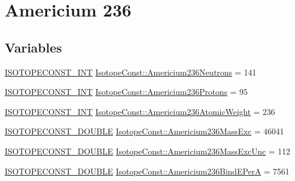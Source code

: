 \hypertarget{group___isotope_const-_americium-_am236}{}\section{Americium 236}
\label{group___isotope_const-_americium-_am236}
\subsection*{Variables}
\begin{DoxyCompactItemize}
\item 
\mbox{\hyperlink{group___isotope_const-_macros_ga5f18360b3e99483a35c32d789e62621c}{I\+S\+O\+T\+O\+P\+E\+C\+O\+N\+S\+T\+\_\+\+I\+NT}} \mbox{\hyperlink{group___isotope_const-_americium-_am236_ga22a544d3981fc8624a3f034f46842110}{Isotope\+Const\+::\+Americium236\+Neutrons}} = 141
\item 
\mbox{\hyperlink{group___isotope_const-_macros_ga5f18360b3e99483a35c32d789e62621c}{I\+S\+O\+T\+O\+P\+E\+C\+O\+N\+S\+T\+\_\+\+I\+NT}} \mbox{\hyperlink{group___isotope_const-_americium-_am236_ga2ce8cc547af7c6305e6d8a7a3defabe1}{Isotope\+Const\+::\+Americium236\+Protons}} = 95
\item 
\mbox{\hyperlink{group___isotope_const-_macros_ga5f18360b3e99483a35c32d789e62621c}{I\+S\+O\+T\+O\+P\+E\+C\+O\+N\+S\+T\+\_\+\+I\+NT}} \mbox{\hyperlink{group___isotope_const-_americium-_am236_ga891b4f99de01095c796bd4e4e93f6797}{Isotope\+Const\+::\+Americium236\+Atomic\+Weight}} = 236
\item 
\mbox{\hyperlink{group___isotope_const-_macros_ga8f45a7272ce02c0b4c65c44636ed719a}{I\+S\+O\+T\+O\+P\+E\+C\+O\+N\+S\+T\+\_\+\+D\+O\+U\+B\+LE}} \mbox{\hyperlink{group___isotope_const-_americium-_am236_ga6058842ebccca24c51eaccd2c54f6528}{Isotope\+Const\+::\+Americium236\+Mass\+Exc}} = 46041
\item 
\mbox{\hyperlink{group___isotope_const-_macros_ga8f45a7272ce02c0b4c65c44636ed719a}{I\+S\+O\+T\+O\+P\+E\+C\+O\+N\+S\+T\+\_\+\+D\+O\+U\+B\+LE}} \mbox{\hyperlink{group___isotope_const-_americium-_am236_gad7f5702ac4aaba8216a31a4003badb5e}{Isotope\+Const\+::\+Americium236\+Mass\+Exc\+Unc}} = 112
\item 
\mbox{\hyperlink{group___isotope_const-_macros_ga8f45a7272ce02c0b4c65c44636ed719a}{I\+S\+O\+T\+O\+P\+E\+C\+O\+N\+S\+T\+\_\+\+D\+O\+U\+B\+LE}} \mbox{\hyperlink{group___isotope_const-_americium-_am236_ga5e0ac52ef97caf2d646beae3fc6862ca}{Isotope\+Const\+::\+Americium236\+Bind\+E\+PerA}} = 7561
\item 

\end{DoxyCompactItemize}
